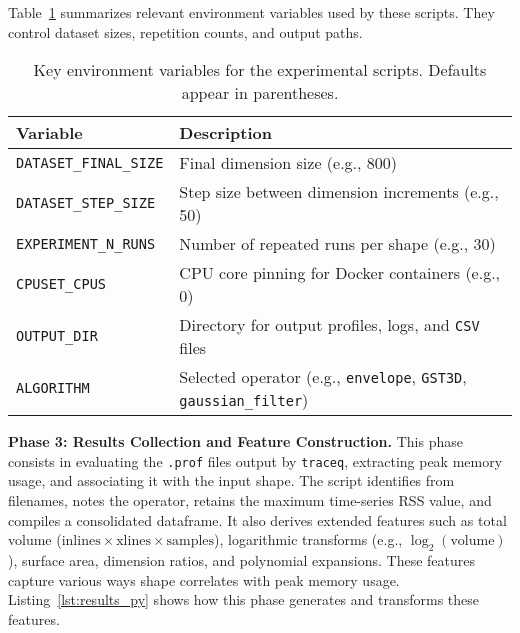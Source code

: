 \noindent
Table~\ref{tab:env_vars} summarizes relevant environment variables used by these scripts.
They control dataset sizes, repetition counts, and output paths.

\begin{table}[htbp]
    \centering
    \caption{Key environment variables for the experimental scripts.
    Defaults appear in parentheses.
    \vspace{1em}}
    \label{tab:env_vars}
    \begin{tabular}{ll}
        \hline
        \textbf{Variable}             & \textbf{Description}                                                                        \\
        \hline
        \texttt{DATASET\_FINAL\_SIZE} & Final dimension size (e.g., 800)                                                            \\
        \texttt{DATASET\_STEP\_SIZE}  & Step size between dimension increments (e.g., 50)                                           \\
        \texttt{EXPERIMENT\_N\_RUNS}  & Number of repeated runs per shape (e.g., 30)                                                \\
        \texttt{CPUSET\_CPUS}         & \ac{CPU} core pinning for Docker containers (e.g., 0)                                       \\
        \texttt{OUTPUT\_DIR}          & Directory for output profiles, logs, and \texttt{\ac{CSV}} files                            \\
        \texttt{ALGORITHM}            & Selected operator (e.g., \texttt{envelope}, \texttt{\ac{GST3D}}, \texttt{gaussian\_filter}) \\
        \hline
    \end{tabular}
\end{table}

\vspace{1em}
\noindent
\textbf{Phase 3: Results Collection and Feature Construction.}
This phase consists in evaluating the \texttt{.prof} files output by \texttt{traceq}, extracting peak memory usage, and associating it with the input shape.
The script identifies  from filenames, notes the operator, retains the maximum time-series \ac{RSS} value, and compiles a consolidated dataframe.
It also derives extended features such as total volume
(\(\text{inlines} \times \text{xlines} \times \text{samples}\)),
logarithmic transforms
(e.g., \(\log_2(\text{volume})\)),
surface area,
dimension ratios,
and polynomial expansions.
These features capture various ways shape correlates with peak memory usage.
Listing~\ref{lst:results_py} shows how this phase generates and transforms these features.

